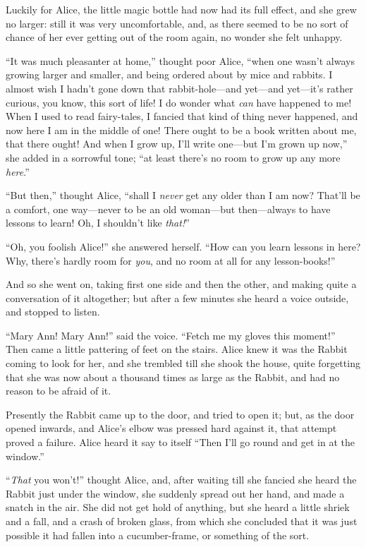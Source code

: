 \documentclass[book, 20pt]{extbook}
\begin{document}
Luckily for Alice, the little magic bottle had now had its full effect,
and she grew no larger: still it was very uncomfortable, and, as there
seemed to be no sort of chance of her ever getting out of the room
again, no wonder she felt unhappy.

``It was much pleasanter at home,'' thought poor Alice, ``when one
wasn't always growing larger and smaller, and being ordered about by
mice and rabbits. I almost wish I hadn't gone down that
rabbit-hole---and yet---and yet---it's rather curious, you know, this
sort of life! I do wonder what \emph{can} have happened to me! When I
used to read fairy-tales, I fancied that kind of thing never happened,
and now here I am in the middle of one! There ought to be a book written
about me, that there ought! And when I grow up, I'll write one---but I'm
grown up now,'' she added in a sorrowful tone; ``at least there's no
room to grow up any more \emph{here}.''

``But then,'' thought Alice, ``shall I \emph{never} get any older than I
am now? That'll be a comfort, one way---never to be an old woman---but
then---always to have lessons to learn! Oh, I shouldn't like
\emph{that!}''

``Oh, you foolish Alice!'' she answered herself. ``How can you learn
lessons in here? Why, there's hardly room for \emph{you}, and no room at
all for any lesson-books!''

And so she went on, taking first one side and then the other, and making
quite a conversation of it altogether; but after a few minutes she heard
a voice outside, and stopped to listen.

``Mary Ann! Mary Ann!'' said the voice. ``Fetch me my gloves this
moment!'' Then came a little pattering of feet on the stairs. Alice knew
it was the Rabbit coming to look for her, and she trembled till she
shook the house, quite forgetting that she was now about a thousand
times as large as the Rabbit, and had no reason to be afraid of it.

Presently the Rabbit came up to the door, and tried to open it; but, as
the door opened inwards, and Alice's elbow was pressed hard against it,
that attempt proved a failure. Alice heard it say to itself ``Then I'll
go round and get in at the window.''

``\emph{That} you won't!'' thought Alice, and, after waiting till she
fancied she heard the Rabbit just under the window, she suddenly spread
out her hand, and made a snatch in the air. She did not get hold of
anything, but she heard a little shriek and a fall, and a crash of
broken glass, from which she concluded that it was just possible it had
fallen into a cucumber-frame, or something of the sort.
\end{document}
